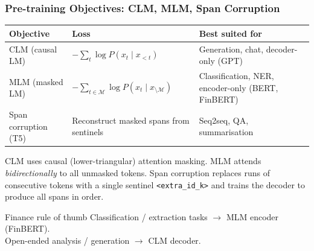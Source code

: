 \documentclass[9pt,t]{beamer}
\begin{document}
\begin{frame}
\frametitle{Pre-training Objectives: CLM, MLM, Span Corruption}

\begin{center}
{\small
\begin{tabular}{p{2.4cm}p{3.8cm}p{3.4cm}}
\toprule
\textbf{Objective} & \textbf{Loss} & \textbf{Best suited for} \\
\midrule
CLM (causal LM) &
  $-\displaystyle\sum_t \log P(x_t \mid x_{<t})$ &
  Generation, chat, decoder-only (GPT) \\[6pt]
MLM (masked LM) &
  $-\displaystyle\sum_{t\in\mathcal{M}} \log P(x_t \mid x_{\setminus\mathcal{M}})$ &
  Classification, NER, encoder-only (BERT, FinBERT) \\[6pt]
Span corruption (T5) &
  Reconstruct masked spans from sentinels &
  Seq2seq, QA, summarisation \\
\bottomrule
\end{tabular}
}
\end{center}

\medskip
CLM uses causal (lower-triangular) attention masking.
MLM attends \emph{bidirectionally} to all unmasked tokens.
Span corruption replaces runs of consecutive tokens with a single sentinel
\texttt{<extra\_id\_k>} and trains the decoder to produce all spans in order.

\medskip
\begin{block}{Finance rule of thumb}
  Classification / extraction tasks $\rightarrow$ MLM encoder (FinBERT). \\
  Open-ended analysis / generation $\rightarrow$ CLM decoder.
\end{block}
\end{frame}
\end{document}
